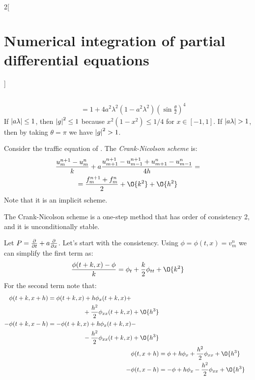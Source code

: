 \documentclass[../../../main_math.tex]{subfiles}
\begin{document}
\begin{multicols}{2}[\section{Numerical integration of partial differential equations}]
\begin{sproof}
\begin{align*}
\begin{split}
      \end{split} \\
       & =1+4a^2\lambda^2(1-a^2\lambda^2){\left(\sin\frac{\theta}{2}\right)}^4
    \end{align*}
    If $\abs{a\lambda}\leq 1$, then $\abs{g}^2 \leq 1$ because $x^2(1-x^2)\leq 1/4$ for $x\in[-1,1]$. If $\abs{a\lambda}>1$, then by taking $\theta=\pi$ we have $\abs{g}^2>1$.
  \end{sproof}
  \begin{proposition}
    Consider the traffic equation of .
    The \emph{Crank-Nicolson scheme} is:
    \begin{multline*}
      \frac{u_m^{n+1}-u_{m}^n}{k}+a\frac{u_{m+1}^{n+1}-u_{m-1}^{n+1}+u_{m+1}^{n}-u_{m-1}^{n}}{4h}=\\ =\frac{f_m^{n+1}+f_m^n}{2}+\O{k^2}+\O{h^2}
    \end{multline*}
    Note that it is an implicit scheme.
  \end{proposition}
  \begin{proposition}
    The Crank-Nicolson scheme is a one-step method that has order of consistency 2, and it is unconditionally stable.
  \end{proposition}
  \begin{sproof}
    Let $P=\pdv{}{t}+a\pdv{}{x}$. Let's start with the consistency. Using $\phi=\phi(t,x)=v_m^n$ we can simplify the first term as:
    $$
      \frac{\phi(t+k,x)-\phi}{k}=\phi_t+\frac{k}{2}\phi_{tt}+\O{k^2}
    $$
    For the second term note that:
    \begin{align*}
      \begin{split}
        \phi(t+k,x+h)  & =\phi(t+k,x)+ h\phi_x(t+k,x)+\\&\hspace{2cm}+\frac{h^2}{2}\phi_{xx}(t+k,x)+\O{h^3}
      \end{split}  \\
      \begin{split}
        -\phi(t+k,x-h) & =-\phi(t+k,x)+ h\phi_x(t+k,x)-\\&\hspace{2cm}-\frac{h^2}{2}\phi_{xx}(t+k,x)+\O{h^3}
      \end{split} \\
      \phi(t,x+h)  & =\phi + h\phi_x+\frac{h^2}{2}\phi_{xx}+\O{h^3}                                       \\
      -\phi(t,x-h) & =-\phi + h\phi_x-\frac{h^2}{2}\phi_{xx}+\O{h^3}
    \end{align*}

\end{sproof}
\end{multicols}
\end{document}
